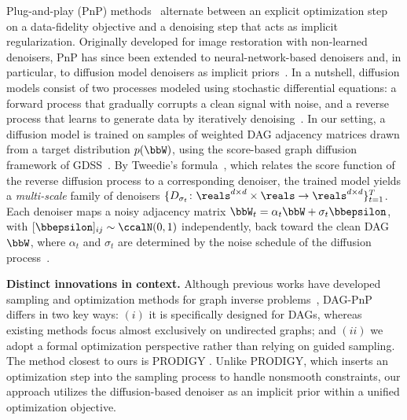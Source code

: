 \documentclass[conference]{IEEEtran}
\newcommand{\nz}[1]{{\color{red}{[Nicolas: #1]}}}
\begin{document}
    Plug-and-play (PnP) methods~\cite{venkatakrishnan2013pnp} alternate between an explicit optimization step on a data-fidelity objective and a denoising step that acts as implicit regularization. 
    Originally developed for image restoration with non-learned denoisers, PnP has since been extended to neural-network-based denoisers and, in particular, to diffusion model denoisers as implicit priors~\cite{graikos2022diffusion, renaud2024plug}. 
    In a nutshell, diffusion models consist of two processes modeled using stochastic differential equations: a forward process that gradually corrupts a clean signal with noise, and a reverse process that learns to generate data by iteratively denoising~\cite{sohl2015deep, ho2020denoising, song2020score}.
    In our setting, a diffusion model is trained on samples of weighted DAG adjacency matrices drawn from a target distribution $p(\bbW)$, using the score-based graph diffusion framework of GDSS~\cite{jo2022score}.
    By Tweedie's formula~\cite{efron2011tweedie}, which relates the score function of the reverse diffusion process to a corresponding denoiser, the trained model yields a \emph{multi-scale} family of denoisers $\{D_{\sigma_t} \colon \reals^{d \times d} \times \reals \to \reals^{d \times d}\}_{t=1}^{T}$.
    Each denoiser maps a noisy adjacency matrix $\bbW_t = \alpha_t \bbW + \sigma_t \bbepsilon$, with $[\bbepsilon]_{ij}\sim\ccalN(0,1)$ independently, back toward the clean DAG $\bbW$, where $\alpha_t$ and $\sigma_t$ are determined by the noise schedule of the diffusion process~\cite{song2020score}.\vspace{2pt}
    
    \noindent \textbf{Distinct innovations in context.} Although previous works have developed sampling and optimization methods for graph inverse problems~\cite{sharma2024diffuse, madeira2024generative, tenorio2025graph, chen2026prior}, DAG-PnP differs in two key ways: $(i)$ it is specifically designed for DAGs, whereas existing methods focus almost exclusively on undirected graphs; and $(ii)$ we adopt a %
    formal optimization perspective rather than relying on guided sampling. The method closest to ours is PRODIGY \cite{sharma2024diffuse}. Unlike PRODIGY, which inserts an optimization step into the sampling process to handle nonsmooth constraints, our approach utilizes the diffusion-based denoiser as an implicit prior within a unified optimization objective.
    
\end{document}
